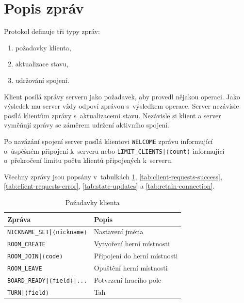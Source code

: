 \documentclass[a4paper, 12pt]{report}
\begin{document}
\section{Popis zpráv}

Protokol definuje tři typy zpráv:

\begin{enumerate}
    \item požadavky klienta,
    \item aktualizace stavu,
    \item udržování spojení.
\end{enumerate}

Klient posílá zprávy serveru jako požadavek, aby provedl nějakou operaci. Jako výsledek mu server vždy odpoví zprávou s~výsledkem operace. Server nezávisle posílá klientům zprávy s~aktualizacemi stavu. Nezávisle si klient a server vyměňují zprávy se záměrem udržení aktivního spojení.

Po navázání spojení server posílá klientovi \texttt{WELCOME} zprávu informující o~úspěšném připojení k~serveru nebo \texttt{LIMIT\_CLIENTS|⟨count⟩} informující o~překročení limitu počtu klientů připojených k~serveru.

Všechny zprávy jsou popsány v~tabulkách \ref{tab:client-requests}, \ref{tab:client-requests-success}, \ref{tab:client-requests-error}, \ref{tab:state-updates} a \ref{tab:retain-connection}.

\begin{table}[]
\begin{center}
\caption{\label{tab:client-requests}Požadavky klienta}
\begin{tabular}{|l|l|}
\hline
\textbf{Zpráva}                           & \textbf{Popis}\\ \hline
\texttt{NICKNAME\_SET|⟨nickname⟩}         & Nastavení jména\\ \hline
\texttt{ROOM\_CREATE}                     & Vytvoření herní místnosti\\ \hline
\texttt{ROOM\_JOIN|⟨code⟩}                & Připojení do herní místnosti\\ \hline
\texttt{ROOM\_LEAVE}                      & Opuštění herní místnosti\\ \hline
\texttt{BOARD\_READY|⟨field⟩|...} & Potvrzení hracího pole\\ \hline
\texttt{TURN|⟨field⟩}                     & Tah\\ \hline
\end{tabular}
\end{center}
\end{table}
\end{document}
